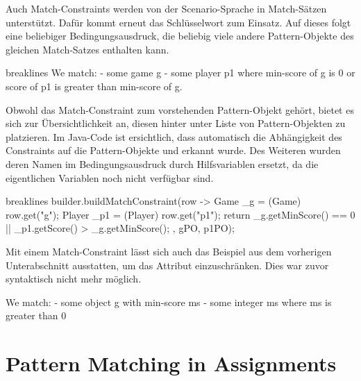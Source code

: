 Auch Match-Constraints werden von der Scenario-Sprache in Match-Sätzen unterstützt.
Dafür kommt erneut das Schlüsselwort  zum Einsatz.
Auf dieses folgt eine beliebiger Bedingungsausdruck, die beliebig viele andere Pattern-Objekte des gleichen Match-Satzes enthalten kann.

\begin{mdcodeblock*}{breaklines}
    We match:
    - some game g
    - some player p1
    where min-score of g is 0 or score of p1 is greater than min-score of g.
\end{mdcodeblock*}

Obwohl das Match-Constraint zum vorstehenden Pattern-Objekt gehört, bietet es sich zur Übersichtlichkeit an,
diesen hinter unter Liste von Pattern-Objekten zu platzieren.
Im Java-Code ist ersichtlich, dass automatisch die Abhängigkeit des Constraints auf die Pattern-Objekte  und  erkannt wurde.
Des Weiteren wurden deren Namen im Bedingungsausdruck durch Hilfsvariablen ersetzt, da die eigentlichen Variablen noch nicht verfügbar sind.

\begin{jcodeblock*}{breaklines}
    builder.buildMatchConstraint(row -> {
        Game _g = (Game) row.get("g");
        Player _p1 = (Player) row.get("p1");
        return _g.getMinScore() == 0 || _p1.getScore() > _g.getMinScore();
    }, gPO, p1PO);
\end{jcodeblock*}

Mit einem Match-Constraint lässt sich auch das Beispiel aus dem vorherigen Unterabschnitt ausstatten, um das Attribut  einzuschränken.
Dies war zuvor syntaktisch nicht mehr möglich.

\begin{mdcodeblock}
    We match:
    - some object g with min-score ms
    - some integer ms where ms is greater than 0
\end{mdcodeblock}

\section{Pattern Matching in Assignments}\label{sec:assignment-pattern-matching}
